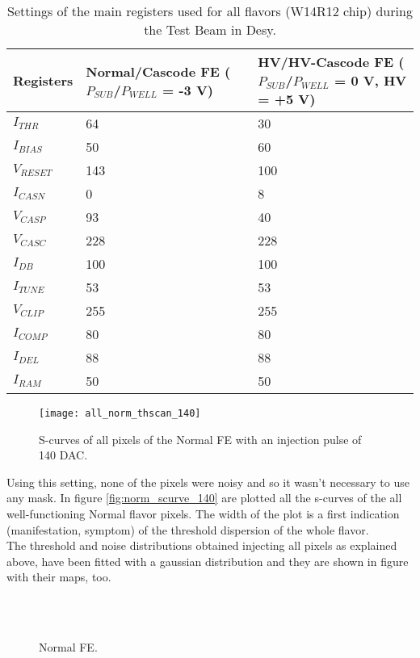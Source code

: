 \begin{table}[h!]
\centering
\begin{tabular}{>{} C{3.2cm}|C{3.7cm}|C{3.5cm}}
Registers & Normal/Cascode FE ($P_{SUB}$/$P_{WELL}$ = -3 V) & HV/HV-Cascode FE ($P_{SUB}$/$P_{WELL}$ = 0 V, HV = +5 V)\\[2ex]
\hline
$I_{THR}$ & 64 & 30\\[0.5ex]
\hline
$I_{BIAS}$ & 50 & 60\\
\hline
$V_{RESET}$ & 143 & 100\\
\hline
$I_{CASN}$ & 0 & 8\\
\hline
$V_{CASP}$ & 93 &40\\
\hline
$V_{CASC}$ & 228 & 228\\
\hline
$I_{DB}$ & 100 & 100\\
\hline
$I_{TUNE}$ & 53 & 53\\
\hline
$V_{CLIP}$ & 255 &255\\
\hline
$I_{COMP}$ & 80 & 80\\
\hline
$I_{DEL}$ & 88 & 88\\
\hline
$I_{RAM}$ & 50 & 50\\
\hline
\end{tabular}
\caption{Settings of the main registers used for all flavors (W14R12 chip) during the Test Beam in Desy.}
\label{tab:tb_settings}
\end{table}


\begin{figure}[h!]
\centering
\texttt{[image: all\_norm\_thscan\_140]}
\caption{S-curves of all pixels of the Normal FE with an injection pulse of 140 DAC.}
\label{fig:norm_scurve_140}
\end{figure}

Using this setting, none of the pixels were noisy and so it wasn't necessary to use any mask.
In figure \vref{fig:norm_scurve_140} are plotted all the s-curves of the all well-functioning Normal flavor pixels. The width of the plot is a first indication (manifestation, symptom) of the threshold dispersion of the whole flavor.\\

The threshold and noise distributions obtained injecting all pixels as explained above, have been fitted with a gaussian distribution and they are shown in figure \pageref{fig:thdist_norm} with their maps, too.

\begin{figure}[h!]
\centering
{}\quad
{}\\
\quad
{}\\
\caption{Normal FE.}
\label{fig:norm}
\end{figure}



